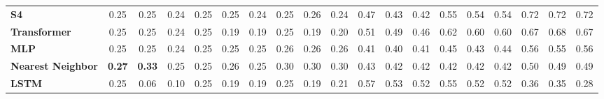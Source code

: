 \begin{table}[t]
{\begin{tabular}{l ccc ccc ccc ccc ccc ccc}
\textbf{S4} & \cellcolor[HTML]{FF6B6B}0.25 & \cellcolor[HTML]{FF6B6B}0.25 & \cellcolor[HTML]{FF6B6B}0.24 & \cellcolor[HTML]{FF6C6B}0.25 & \cellcolor[HTML]{FF6C6B}0.25 & \cellcolor[HTML]{FF6B6B}0.24 & \cellcolor[HTML]{FF6D6A}0.25 & \cellcolor[HTML]{FF6E6A}0.26 & \cellcolor[HTML]{FF6B6B}0.24 & \cellcolor[HTML]{FFC840}0.47 & \cellcolor[HTML]{FFB649}0.43 & \cellcolor[HTML]{FFB34A}0.42 & \cellcolor[HTML]{DAD344}0.55 & \cellcolor[HTML]{E3D342}0.54 & \cellcolor[HTML]{E2D342}0.54 & \cellcolor[HTML]{65D061}0.72 & \cellcolor[HTML]{68D060}0.72 & \cellcolor[HTML]{67D060}0.72 \\
\textbf{Transformer} & \cellcolor[HTML]{FF6B6B}0.25 & \cellcolor[HTML]{FF6B6B}0.25 & \cellcolor[HTML]{FF6B6B}0.24 & \cellcolor[HTML]{FF6C6B}0.25 & \cellcolor[HTML]{FF6B6B}0.19 & \cellcolor[HTML]{FF6B6B}0.19 & \cellcolor[HTML]{FF6C6B}0.25 & \cellcolor[HTML]{FF6B6B}0.19 & \cellcolor[HTML]{FF6B6B}0.20 & \cellcolor[HTML]{F8D43D}0.51 & \cellcolor[HTML]{FFCF3D}0.49 & \cellcolor[HTML]{FFC343}0.46 & \cellcolor[HTML]{AFD24F}0.62 & \cellcolor[HTML]{B8D24C}0.60 & \cellcolor[HTML]{BBD24C}0.60 & \cellcolor[HTML]{86D159}0.67 & \cellcolor[HTML]{83D05A}0.68 & \cellcolor[HTML]{89D158}0.67 \\
\textbf{MLP} & \cellcolor[HTML]{FF6B6B}0.25 & \cellcolor[HTML]{FF6B6B}0.25 & \cellcolor[HTML]{FF6B6B}0.24 & \cellcolor[HTML]{FF6B6B}0.25 & \cellcolor[HTML]{FF6B6B}0.25 & \cellcolor[HTML]{FF6B6B}0.25 & \cellcolor[HTML]{FF6F69}0.26 & \cellcolor[HTML]{FF6F69}0.26 & \cellcolor[HTML]{FF6E6A}0.26 & \cellcolor[HTML]{FFB04B}0.41 & \cellcolor[HTML]{FFAB4E}0.40 & \cellcolor[HTML]{FFAC4D}0.41 & \cellcolor[HTML]{FFBD46}0.45 & \cellcolor[HTML]{FFB848}0.43 & \cellcolor[HTML]{FFBA47}0.44 & \cellcolor[HTML]{D6D345}0.56 & \cellcolor[HTML]{D9D344}0.55 & \cellcolor[HTML]{D8D345}0.56 \\
\textbf{Nearest Neighbor} & \cellcolor[HTML]{FF7268}\textbf{0.27} & \cellcolor[HTML]{FF8D5C}\textbf{0.33} & \cellcolor[HTML]{FF6B6B}0.25 & \cellcolor[HTML]{FF6D6A}0.25 & \cellcolor[HTML]{FF6D6A}0.26 & \cellcolor[HTML]{FF6D6A}0.25 & \cellcolor[HTML]{FF8161}0.30 & \cellcolor[HTML]{FF8261}0.30 & \cellcolor[HTML]{FF7F62}0.30 & \cellcolor[HTML]{FFB848}0.43 & \cellcolor[HTML]{FFB24A}0.42 & \cellcolor[HTML]{FFB34A}0.42 & \cellcolor[HTML]{FFB34A}0.42 & \cellcolor[HTML]{FFB449}0.42 & \cellcolor[HTML]{FFB14B}0.42 & \cellcolor[HTML]{FFD23C}0.50 & \cellcolor[HTML]{FFD03D}0.49 & \cellcolor[HTML]{FFD03D}0.49 \\
\textbf{LSTM} & \cellcolor[HTML]{FF6B6B}0.25 & \cellcolor[HTML]{FF6B6B}0.06 & \cellcolor[HTML]{FF6B6B}0.10 & \cellcolor[HTML]{FF6B6B}0.25 & \cellcolor[HTML]{FF6B6B}0.19 & \cellcolor[HTML]{FF6B6B}0.19 & \cellcolor[HTML]{FF6B6B}0.25 & \cellcolor[HTML]{FF6B6B}0.19 & \cellcolor[HTML]{FF6B6B}0.21 & \cellcolor[HTML]{CED347}0.57 & \cellcolor[HTML]{E9D340}0.53 & \cellcolor[HTML]{F1D43F}0.52 & \cellcolor[HTML]{DFD343}0.55 & \cellcolor[HTML]{F3D43E}0.52 & \cellcolor[HTML]{F4D43E}0.52 & \cellcolor[HTML]{FF9856}0.36 & \cellcolor[HTML]{FF9757}0.35 & \cellcolor[HTML]{FF7A64}0.28 \\

\end{tabular}}
\end{table}
